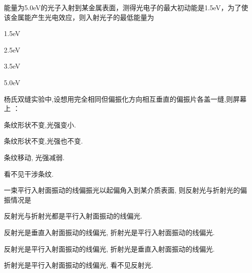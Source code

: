\documentclass{njustexam}
\begin{document}
  \begin{problem}
    能量为5.0eV的光子入射到某金属表面，测得光电子的最大初动能是1.5eV，为了使该金属能产生光电效应，则入射光子的最低能量为                                                 
        \begin{abcd}
          \item  1.5eV 
          \item  2.5eV  
          \item  3.5eV   
          \item  5.0eV
        \end{abcd}
        \end{problem}

\begin{problem}

    杨氏双缝实验中,设想用完全相同但偏振化方向相互垂直的偏振片各盖一缝,则屏幕上 ：
    \begin{abcd}
      \item 条纹形状不变,光强变小.
      \item 条纹形状不变,光强也不变.
      \item 条纹移动, 光强减弱.
      \item 看不见干涉条纹.
    \end{abcd}
\end{problem}


\begin{problem}
  一束平行入射面振动的线偏振光以起偏角入到某介质表面, 则反射光与折射光的偏振情况是 
  \begin{abcd}
    \item 反射光与折射光都是平行入射面振动的线偏光.
    \item 反射光是垂直入射面振动的线偏光, 折射光是平行入射面振动的线偏光.
    \item 反射光是平行入射面振动的线偏光, 折射光是垂直入射面振动的线偏光.
    \item 折射光是平行入射面振动的线偏光, 看不见反射光.
  \end{abcd}
\end{problem}






\end{document}
